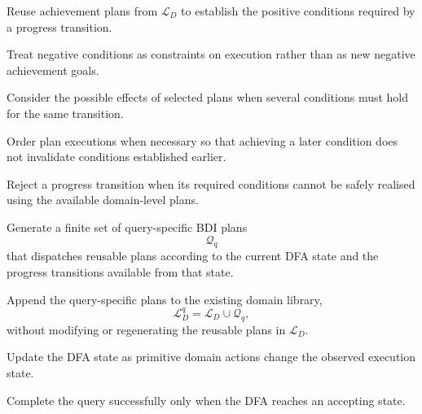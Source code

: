 Reuse achievement plans from \(\mathcal{L}_D\) to establish the
positive conditions required by a progress transition.

Treat negative conditions as constraints on execution rather than as
new negative achievement goals.

Consider the possible effects of selected plans when several conditions
must hold for the same transition.

Order plan executions when necessary so that achieving a later
condition does not invalidate conditions established earlier.

Reject a progress transition when its required conditions cannot be
safely realised using the available domain-level plans.

Generate a finite set of query-specific BDI plans
\[
\mathcal{Q}_q
\]
that dispatches reusable plans according to the current DFA state and
the progress transitions available from that state.

Append the query-specific plans to the existing domain library,
\[
\mathcal{L}_D^q
=
\mathcal{L}_D\cup\mathcal{Q}_q,
\]
without modifying or regenerating the reusable plans in
\(\mathcal{L}_D\).

Update the DFA state as primitive domain actions change the observed
execution state.

Complete the query successfully only when the DFA reaches an accepting
state.
